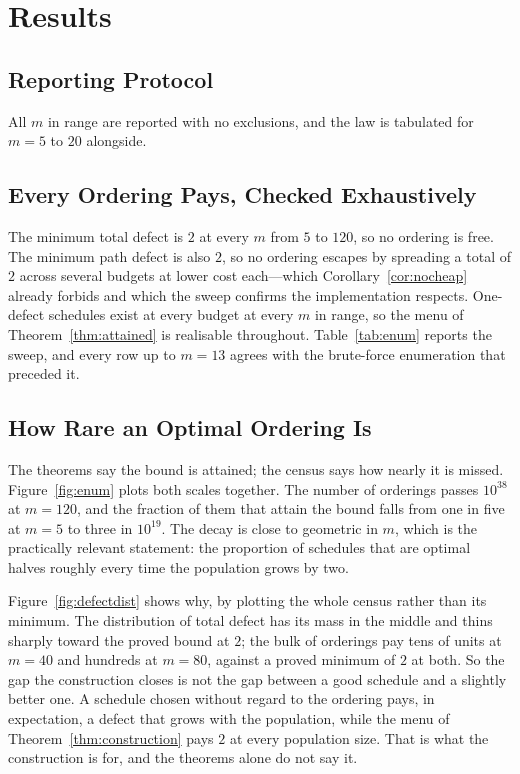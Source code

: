 \section{Results}
\label{sec:results}

\subsection{Reporting Protocol}

All $m$ in range are reported with no exclusions, and the law is tabulated for $m=5$ to $20$
alongside.

\subsection{Every Ordering Pays, Checked Exhaustively}

The minimum total defect is $2$ at every $m$ from $5$ to $120$, so no ordering is free. The
minimum path defect is also $2$, so no ordering escapes by spreading a total of $2$ across
several budgets at lower cost each---which Corollary~\ref{cor:nocheap} already forbids and
which the sweep confirms the implementation respects. One-defect schedules exist at every
budget at every $m$ in range, so the menu of Theorem~\ref{thm:attained} is realisable
throughout. Table~\ref{tab:enum} reports the sweep, and every row up to $m=13$ agrees with the
brute-force enumeration that preceded it. \NUM{}



\subsection{How Rare an Optimal Ordering Is}

The theorems say the bound is attained; the census says how nearly it is missed.
Figure~\ref{fig:enum} plots both scales together. The number of orderings passes $10^{38}$ at
$m=120$, and the fraction of them that attain the bound falls from one in five at $m=5$ to
three in $10^{19}$. The decay is close to geometric in $m$, which is the practically relevant
statement: the proportion of schedules that are optimal halves roughly every time the
population grows by two.

Figure~\ref{fig:defectdist} shows why, by plotting the whole census rather than its minimum.
The distribution of total defect has its mass in the middle and thins sharply toward the
proved bound at $2$; the bulk of orderings pay tens of units at $m=40$ and hundreds at
$m=80$, against a proved minimum of $2$ at both. So the gap the construction closes is not
the gap between a good schedule and a slightly better one. A schedule chosen without regard
to the ordering pays, in expectation, a defect that grows with the population, while the
menu of Theorem~\ref{thm:construction} pays $2$ at every population size. That is what the
construction is for, and the theorems alone do not say it. \NUM{}

